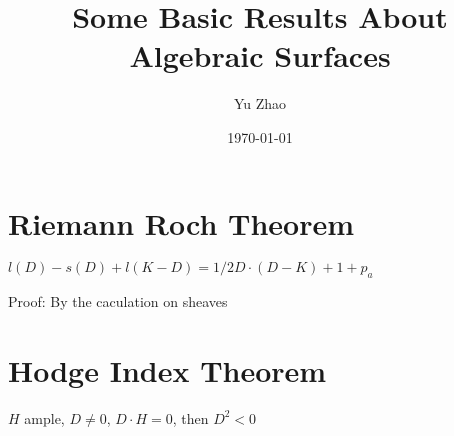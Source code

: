 \documentclass[11pt]{article}
\author{Yu Zhao}
\date{\today}
\title{Some Basic Results About Algebraic Surfaces}
\begin{document}
\maketitle
\setcounter{secnumdepth}{-1}

\section{Riemann Roch Theorem}
\label{sec-1}

$l(D)-s(D)+l(K-D)=1/2 D\cdot(D-K)+1+p_{a}$


Proof: By the caculation on sheaves   
\section{Hodge Index Theorem}
\label{sec-2}

$H$ ample, $D \neq 0$, $D\cdot H=0$, then $D^{2}<0$
\end{document}

